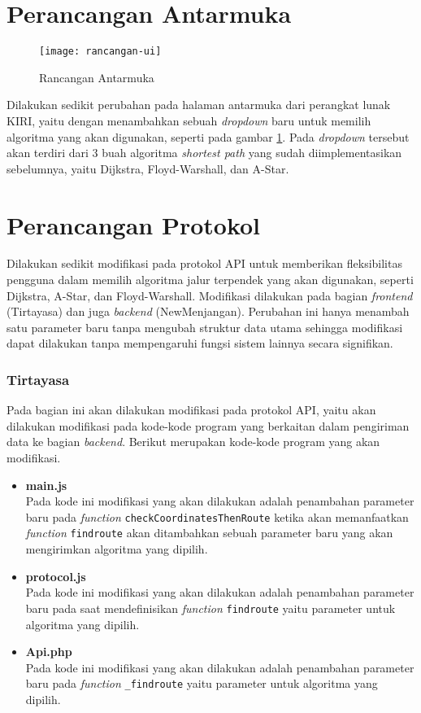 \section{Perancangan Antarmuka}
\label{sec:rancanganui}

\begin{figure}[H]
    \centering
    \texttt{[image: rancangan-ui]}
    \caption{Rancangan Antarmuka}
    \label{fig:rancanganui}
\end{figure}

\noindent
Dilakukan sedikit perubahan pada halaman antarmuka dari perangkat lunak KIRI, yaitu dengan menambahkan sebuah \textit{dropdown} baru untuk memilih algoritma yang akan digunakan, seperti pada gambar \ref{fig:rancanganui}. Pada \textit{dropdown} tersebut akan terdiri dari 3 buah algoritma \textit{shortest path} yang sudah diimplementasikan sebelumnya, yaitu Dijkstra, Floyd-Warshall, dan A-Star. 
\newpage
\section{Perancangan Protokol}
Dilakukan sedikit modifikasi pada protokol API untuk memberikan fleksibilitas pengguna dalam memilih algoritma jalur terpendek yang akan digunakan, seperti Dijkstra, A-Star, dan Floyd-Warshall. Modifikasi dilakukan pada bagian \textit{frontend} (Tirtayasa) dan juga \textit{backend} (NewMenjangan). Perubahan ini hanya menambah satu parameter baru tanpa mengubah struktur data utama sehingga modifikasi dapat dilakukan tanpa mempengaruhi fungsi sistem lainnya secara signifikan.

\subsubsection{Tirtayasa}
Pada bagian ini akan dilakukan modifikasi pada protokol API, yaitu akan dilakukan modifikasi pada kode-kode program yang berkaitan dalam pengiriman data ke bagian \textit{backend}. Berikut merupakan kode-kode program yang akan modifikasi.
\begin{itemize}
    \item \textbf{main.js}
    \\ Pada kode ini modifikasi yang akan dilakukan adalah penambahan parameter baru pada \textit{function} \texttt{checkCoordinatesThenRoute} ketika akan memanfaatkan \textit{function} \texttt{findroute} akan ditambahkan sebuah parameter baru yang akan mengirimkan algoritma yang dipilih.

    \item \textbf{protocol.js}
    \\ Pada kode ini modifikasi yang akan dilakukan adalah penambahan parameter baru pada saat mendefinisikan \textit{function} \texttt{findroute} yaitu parameter untuk algoritma yang dipilih.

    \item \textbf{Api.php}
    \\ Pada kode ini modifikasi yang akan dilakukan adalah penambahan parameter baru pada \textit{function} \texttt{\_findroute} yaitu parameter untuk algoritma yang dipilih.
\end{itemize}

